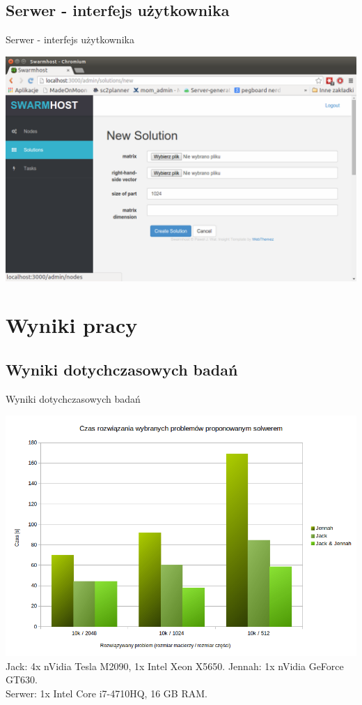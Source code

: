 \documentclass[12pt]{beamer}
\begin{document}
\subsection{Serwer - interfejs użytkownika}
\begin{frame}{Serwer - interfejs użytkownika}
\begin{center}
	\includegraphics[scale=0.3]{swarmhost}
\end{center}
\end{frame}

\section{Wyniki pracy}

\subsection{Wyniki dotychczasowych badań}
\begin{frame}{Wyniki dotychczasowych badań}
\begin{center}
	\includegraphics[scale=0.45]{proof}
	\newline
	\tiny Jack: 4x nVidia Tesla M2090, 1x Intel Xeon X5650. Jennah: 1x nVidia GeForce GT630.\\Serwer: 1x Intel Core i7-4710HQ, 16 GB RAM.
\end{center}
\end{frame}
\end{document}
